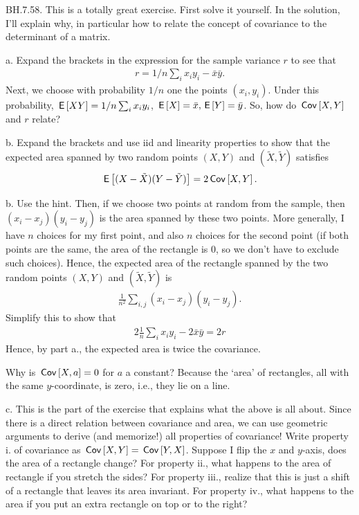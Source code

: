 \begin{exercise}
BH.7.58. This is a totally great exercise. First solve it yourself. In the solution, I'll explain why, in particular how to relate the concept of covariance to the determinant of a matrix.

\begin{hint}
a. Expand the brackets in the expression for the sample variance $r$ to see that
\begin{align*}
r = 1/n \sum_i x_i y_i - \bar x \bar y.
\end{align*}
Next, we choose with probability $1/n$ one the points $(x_i, y_{i})$.  Under this probability, $\,\mathsf{E}\left[X Y\right] = 1/n \sum_i x_i y_i$, $\,\mathsf{E}\left[X\right] = \bar x, \,\mathsf{E}\left[Y\right] = \bar y$. So, how do $\,\mathsf{Cov}\left[X,Y\right]$ and $r$ relate?


b. Expand the brackets and use iid and linearity properties to show that the expected area spanned by two random points $(X,Y)$ and $(\tilde X, \tilde Y)$ satisfies
\begin{align*}
\,\mathsf{E}\left[(X-\tilde X)(Y-\tilde Y)\right] = 2\,\mathsf{Cov}\left[X,Y\right].
\end{align*}

\end{hint}
\begin{solution}

b. Use the hint. Then, if we choose two points at random from the sample, then $(x_i-x_j)(y_i-y_j)$ is the area spanned by these  two points.
More generally, I have $n$ choices for my first point, and also $n$ choices for the second point (if both points are the same, the area of the rectangle is 0, so we don't have to exclude such choices).
Hence, the expected area of the rectangle spanned by the two random points $(X,Y)$ and $(\tilde X, \tilde Y)$ is
\begin{align*}
\frac 1 {n^2} \sum_{i,j} (x_i-x_j)(y_i-y_j).
\end{align*}
Simplify this to show that
\begin{align*}
2 \frac 1 n \sum_i x_i y_i - 2 \bar x \bar y = 2 r
\end{align*}
Hence, by part a., the expected area is twice the covariance.

Why is $\,\mathsf{Cov}\left[X,a\right]= 0$ for $a$ a constant? Because the `area' of rectangles, all with the same \(y\)-coordinate, is zero, i.e., they lie on a line.

c.  This is the part of the exercise that explains what the above is all about.
Since there is a direct relation between covariance and area, we can use geometric arguments to derive (and memorize!) all properties of covariance! Write property i. of covariance  as $\,\mathsf{Cov}\left[X,Y\right] = \,\mathsf{Cov}\left[Y,X\right]$. Suppose I flip the \(x\) and \(y\)-axis, does the area of a rectangle change?  For property ii., what happens to the area of rectangle if you stretch the sides? For property iii., realize that this is just a shift of a rectangle that leaves its area invariant. For property iv., what happens to the area if you put an extra rectangle on top or to the right?


\end{solution}
\end{exercise}
